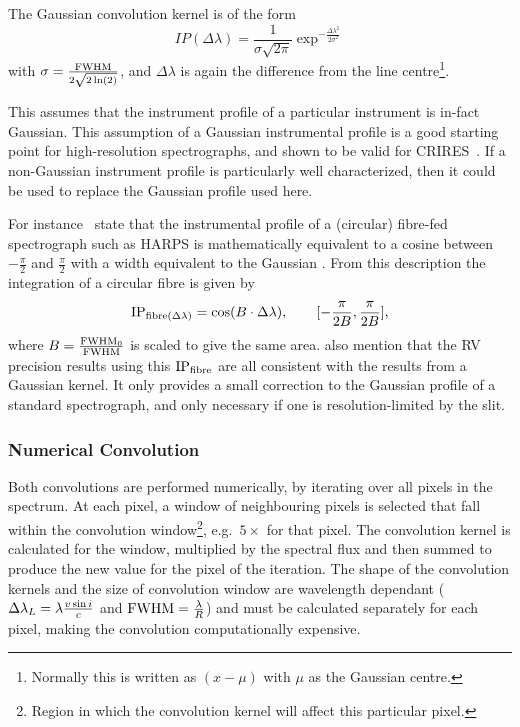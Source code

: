 The Gaussian convolution kernel is of the form
\begin{equation}
IP(\Delta\lambda) = \frac{1}{\sigma \sqrt{2\pi}} \exp^{-\frac{{\Delta\lambda}^{2}}{2 {\sigma}^{2}}}
\label{eqn:IP_profile}
\end{equation}
with $\sigma = \frac{\textrm{FWHM}}{2\sqrt{2 \ln(2)}}$, and $\Delta \lambda$ is again the difference from the line centre\footnote{Normally this is written as $(x-\mu)$ with $\mu$ as the Gaussian centre.}.

This assumes that the instrument profile of a particular instrument is in-fact Gaussian.
This assumption of a Gaussian instrumental profile is a good starting point for high-resolution spectrographs, and shown to be valid for CRIRES~\citep{seifahrt_synthesising_2010}.
If a non-Gaussian instrument profile is particularly well characterized, then it could be used to replace the Gaussian profile used here.

For instance~\citet{artigau_optical_2018} state that the instrumental profile of a (circular) fibre-fed spectrograph such as {HARPS} is mathematically equivalent to a cosine between $-\frac{\pi}{2}$ and $\frac{\pi}{2}$ with a width equivalent to the Gaussian {\fwhm}.
From this description the integration of a circular fibre is given by
\begin{equation}
\textrm{IP}{}_{\textrm{fibre}(\Delta\lambda)} = \cos(B\cdot\Delta\lambda),  \hspace{2em} [-\frac{\pi}{2 B}, \frac{\pi}{2 B}],
\end{equation}
where {$B = \frac{\textrm{FWHM}_{0}}{\textrm{FWHM}}$ } is scaled to give the same area.
\citet{artigau_optical_2018} also mention that the {RV} precision results using this $\textrm{IP}{}_{\textrm{fibre}}$ are all consistent with the results from a Gaussian kernel.
It only provides a small correction to the Gaussian profile of a standard spectrograph, and only necessary if one is resolution-limited by the slit.%

\subsubsection*{Numerical Convolution}
\label{subsubsec:numerical_convolution}
Both convolutions are performed numerically, by iterating over all pixels in the spectrum.
At each pixel, a window of neighbouring pixels is selected that fall within the convolution window\footnote{Region in which the convolution kernel will affect this particular pixel.}, e.g.\ \(5\times\)\fwhm{} for that pixel.
The convolution kernel is calculated for the window, multiplied by the spectral flux and then summed to produce the new value for the pixel of the iteration.
The shape of the convolution kernels and the size of convolution window are wavelength dependant (\(\Delta\lambda_{L}=\lambda \frac{v\sin{i}}{c}\) and \({\textrm{FWHM}}=\frac{\lambda}{R}\)) and must be calculated separately for each pixel, making the convolution computationally expensive.

